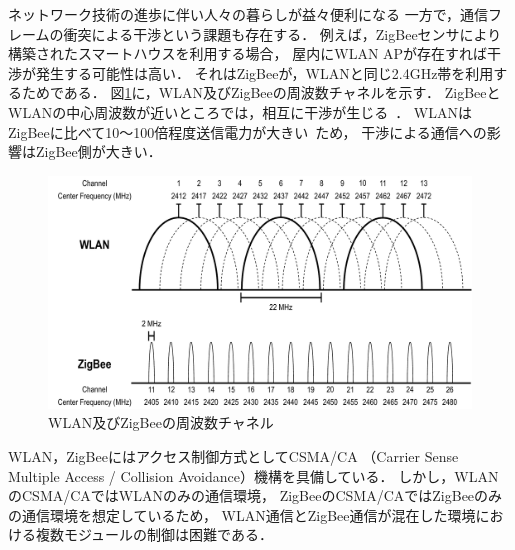 \documentclass[technicalreport]{ieicej}
\begin{document}
ネットワーク技術の進歩に伴い人々の暮らしが益々便利になる
一方で，通信フレームの衝突による干渉という課題も存在する．
例えば，ZigBeeセンサにより構築されたスマートハウスを利用する場合，
屋内にWLAN APが存在すれば干渉が発生する可能性は高い．
それはZigBeeが，WLANと同じ2.4GHz帯を利用するためである．
図\ref{fig:frequency}に，WLAN及びZigBeeの周波数チャネルを示す．
ZigBeeとWLANの中心周波数が近いところでは，相互に干渉が生じる~\cite{Shuaib06:}．
WLANはZigBeeに比べて10〜100倍程度送信電力が大きい~\cite{Chieh10:}ため，
干渉による通信への影響はZigBee側が大きい．

\begin{figure}[bt]
 \centering
 \includegraphics[width=\columnwidth]{figure/frequency.pdf}
 \caption{WLAN及びZigBeeの周波数チャネル}
 \label{fig:frequency}
\end{figure}

WLAN，ZigBeeにはアクセス制御方式としてCSMA/CA
（Carrier Sense Multiple Access / Collision Avoidance）機構を具備している．
しかし，WLANのCSMA/CAではWLANのみの通信環境，
ZigBeeのCSMA/CAではZigBeeのみの通信環境を想定しているため，
WLAN通信とZigBee通信が混在した環境における複数モジュールの制御は困難である．
\end{document}
